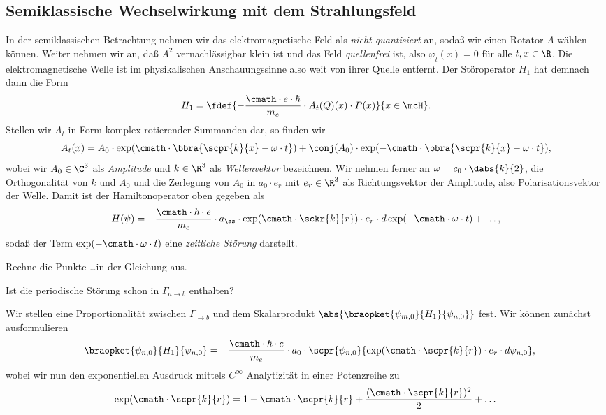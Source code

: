 \documentclass{subfile}
\begin{document}
    
    \subsection{Semiklassische Wechselwirkung mit dem Strahlungsfeld}
        In der semiklassischen Betrachtung nehmen wir das elektromagnetische Feld als \emph{nicht quantisiert} an, sodaß wir einen Rotator $A$ wählen können. Weiter nehmen wir an, daß $A^2$ vernachlässigbar klein ist und das Feld \emph{quellenfrei} ist, also $\varphi_t(x) = 0$ für alle $t,x\in\R$. Die elektromagnetische Welle ist im physikalischen Anschauungssinne also weit von ihrer Quelle entfernt. Der Störoperator $H_1$ hat demnach dann die Form 
        \[
            H_1 = \fdef{-\frac{\cmath\cdot e\cdot\hbar}{m_e}\cdot A_t(Q)(x)\cdot P(x)}{x\in\mcH}.
        \]
        Stellen wir $A_t$ in Form komplex rotierender Summanden dar, so finden wir
        \[
            A_t(x) = A_0\cdot\exp(\cmath\cdot \bbra{\scpr{k}{x} - \omega\cdot t}) + \conj(A_0)\cdot\exp(-\cmath\cdot\bbra{\scpr{k}{x} - \omega\cdot t}),
        \]
        wobei wir $A_0\in\C^3$ als \emph{Amplitude} und $k\in\R^3$ als \emph{Wellenvektor} bezeichnen. Wir nehmen ferner an $\omega = c_0\cdot\dabs{k}{2}$, die Orthogonalität von $k$ und $A_0$ und die Zerlegung von $A_0$ in $a_0\cdot e_r$ mit $e_r\in\R^3$ als Richtungsvektor der Amplitude, also Polarisationsvektor der Welle. Damit ist der Hamiltonoperator oben gegeben als
        \[
            H(\psi) = -\frac{\cmath\cdot\hbar\cdot e}{m_e}\cdot a_ß\cdot\exp(\cmath\cdot\sckr{k}{r})\cdot e_r\cdot d\exp(-\cmath\cdot\omega\cdot t) + \dots,
        \] 
        sodaß der Term $\exp(-\cmath\cdot\omega\cdot t)$ eine \emph{zeitliche Störung} darstellt. 
        \begin{Aufgabe}
            \nr{} Rechne die Punkte \dots in der Gleichung aus. 

            \nr{} Ist die periodische Störung schon in $\Gamma_{a\to b}$ enthalten?
        \end{Aufgabe}
        \noindent Wir stellen eine Proportionalität zwischen $\Gamma_{\to b}$ und dem Skalarprodukt $\abs{\braopket{\psi_{m,0}}{H_1}{\psi_{n,0}}}$ fest. Wir können zunächst ausformulieren 
        \[
            -\braopket{\psi_{n,0}}{H_1}{\psi_{n,0}} = -\frac{\cmath\cdot\hbar\cdot e}{m_e}\cdot a_0\cdot\scpr{\psi_{n,0}}{\exp(\cmath\cdot\scpr{k}{r})\cdot e_r\cdot d\psi_{n,0}},
        \]
        wobei wir nun den exponentiellen Ausdruck mittels $C^\infty$ Analytizität in einer Potenzreihe zu 
        \[
            \exp(\cmath\cdot\scpr{k}{r}) = 1 + \cmath\cdot\scpr{k}{r} + \frac{(\cmath\cdot\scpr{k}{r})^2}{2} + \dots
        \]
\end{document}
